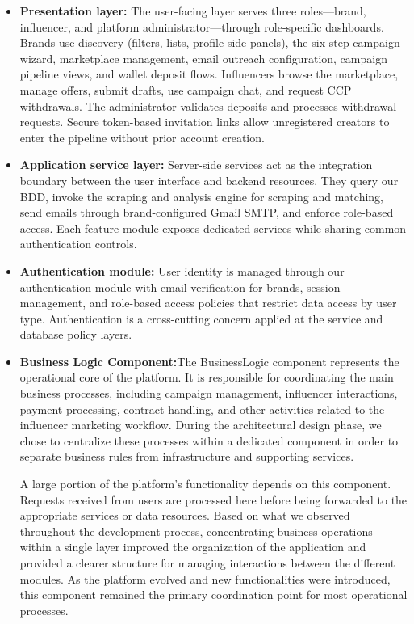 \begin{itemize}
    \item \textbf{Presentation layer:} The user-facing layer serves three roles---brand, influencer, and platform administrator---through role-specific dashboards. Brands use discovery (filters, lists, profile side panels), the six-step campaign wizard, marketplace management, email outreach configuration, campaign pipeline views, and wallet deposit flows. Influencers browse the marketplace, manage offers, submit drafts, use campaign chat, and request CCP withdrawals. The administrator validates deposits and processes withdrawal requests. Secure token-based invitation links allow unregistered creators to enter the pipeline without prior account creation.

    \item \textbf{Application service layer:} Server-side services act as the integration boundary between the user interface and backend resources. They query our BDD, invoke the scraping and analysis engine for scraping and matching, send emails through brand-configured Gmail SMTP, and enforce role-based access. Each feature module exposes dedicated services while sharing common authentication controls.

    \item \textbf{Authentication module:} User identity is managed through our authentication module with email verification for brands, session management, and role-based access policies that restrict data access by user type. Authentication is a cross-cutting concern applied at the service and database policy layers.

    \item \textbf{Business Logic Component:}The BusinessLogic component represents the operational core of the platform. It is responsible for coordinating the main business processes, including campaign management, influencer interactions, payment processing, contract handling, and other activities related to the influencer marketing workflow. During the architectural design phase, we chose to centralize these processes within a dedicated component in order to separate business rules from infrastructure and supporting services.

A large portion of the platform's functionality depends on this component. Requests received from users are processed here before being forwarded to the appropriate services or data resources. Based on what we observed throughout the development process, concentrating business operations within a single layer improved the organization of the application and provided a clearer structure for managing interactions between the different modules. As the platform evolved and new functionalities were introduced, this component remained the primary coordination point for most operational processes.
   

\end{itemize}
